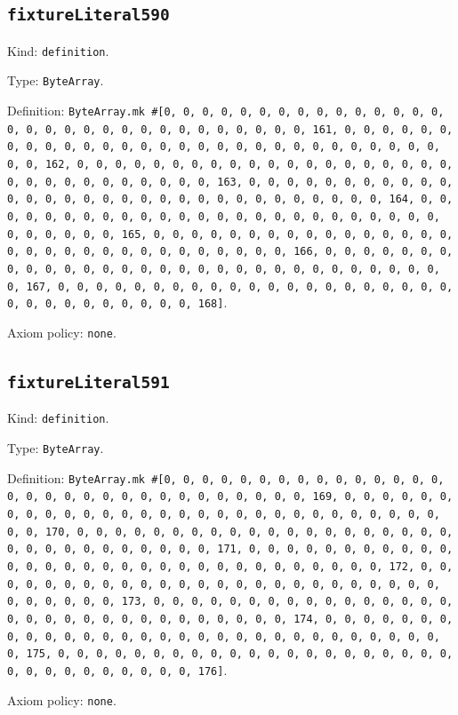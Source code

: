 \documentclass[11pt]{article}
\begin{document}
\subsection*{\texttt{fixtureLiteral590}}
\noindent Kind: \texttt{definition}.\par
\noindent Type: \texttt{ByteArray}.\par
\noindent Definition: \texttt{ByteArray.mk \#[0, 0, 0, 0, 0, 0, 0, 0, 0, 0, 0, 0, 0, 0, 0, 0, 0, 0, 0, 0, 0, 0, 0, 0, 0, 0, 0, 0, 0, 0, 0, 161, 0, 0, 0, 0, 0, 0, 0, 0, 0, 0, 0, 0, 0, 0, 0, 0, 0, 0, 0, 0, 0, 0, 0, 0, 0, 0, 0, 0, 0, 0, 0, 162, 0, 0, 0, 0, 0, 0, 0, 0, 0, 0, 0, 0, 0, 0, 0, 0, 0, 0, 0, 0, 0, 0, 0, 0, 0, 0, 0, 0, 0, 0, 0, 163, 0, 0, 0, 0, 0, 0, 0, 0, 0, 0, 0, 0, 0, 0, 0, 0, 0, 0, 0, 0, 0, 0, 0, 0, 0, 0, 0, 0, 0, 0, 0, 164, 0, 0, 0, 0, 0, 0, 0, 0, 0, 0, 0, 0, 0, 0, 0, 0, 0, 0, 0, 0, 0, 0, 0, 0, 0, 0, 0, 0, 0, 0, 0, 165, 0, 0, 0, 0, 0, 0, 0, 0, 0, 0, 0, 0, 0, 0, 0, 0, 0, 0, 0, 0, 0, 0, 0, 0, 0, 0, 0, 0, 0, 0, 0, 166, 0, 0, 0, 0, 0, 0, 0, 0, 0, 0, 0, 0, 0, 0, 0, 0, 0, 0, 0, 0, 0, 0, 0, 0, 0, 0, 0, 0, 0, 0, 0, 167, 0, 0, 0, 0, 0, 0, 0, 0, 0, 0, 0, 0, 0, 0, 0, 0, 0, 0, 0, 0, 0, 0, 0, 0, 0, 0, 0, 0, 0, 0, 0, 168]}.\par
\noindent Axiom policy: \texttt{none}.\par
\subsection*{\texttt{fixtureLiteral591}}
\noindent Kind: \texttt{definition}.\par
\noindent Type: \texttt{ByteArray}.\par
\noindent Definition: \texttt{ByteArray.mk \#[0, 0, 0, 0, 0, 0, 0, 0, 0, 0, 0, 0, 0, 0, 0, 0, 0, 0, 0, 0, 0, 0, 0, 0, 0, 0, 0, 0, 0, 0, 0, 169, 0, 0, 0, 0, 0, 0, 0, 0, 0, 0, 0, 0, 0, 0, 0, 0, 0, 0, 0, 0, 0, 0, 0, 0, 0, 0, 0, 0, 0, 0, 0, 170, 0, 0, 0, 0, 0, 0, 0, 0, 0, 0, 0, 0, 0, 0, 0, 0, 0, 0, 0, 0, 0, 0, 0, 0, 0, 0, 0, 0, 0, 0, 0, 171, 0, 0, 0, 0, 0, 0, 0, 0, 0, 0, 0, 0, 0, 0, 0, 0, 0, 0, 0, 0, 0, 0, 0, 0, 0, 0, 0, 0, 0, 0, 0, 172, 0, 0, 0, 0, 0, 0, 0, 0, 0, 0, 0, 0, 0, 0, 0, 0, 0, 0, 0, 0, 0, 0, 0, 0, 0, 0, 0, 0, 0, 0, 0, 173, 0, 0, 0, 0, 0, 0, 0, 0, 0, 0, 0, 0, 0, 0, 0, 0, 0, 0, 0, 0, 0, 0, 0, 0, 0, 0, 0, 0, 0, 0, 0, 174, 0, 0, 0, 0, 0, 0, 0, 0, 0, 0, 0, 0, 0, 0, 0, 0, 0, 0, 0, 0, 0, 0, 0, 0, 0, 0, 0, 0, 0, 0, 0, 175, 0, 0, 0, 0, 0, 0, 0, 0, 0, 0, 0, 0, 0, 0, 0, 0, 0, 0, 0, 0, 0, 0, 0, 0, 0, 0, 0, 0, 0, 0, 0, 176]}.\par
\noindent Axiom policy: \texttt{none}.\par
\end{document}
